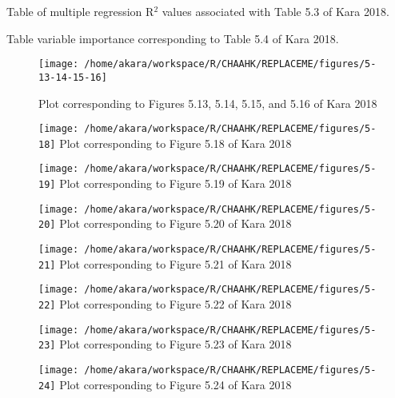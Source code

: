 \documentclass{article}
\begin{document}
\begin{table}[H]
\end{table}
\noindent Table of multiple regression R$ ^{2} $ values associated with Table 5.3 of Kara 2018.
\newline
\begin{table}[H]
\end{table}
\noindent Table variable importance corresponding to Table 5.4 of Kara 2018.
\begin{sidewaysfigure}
	\texttt{[image: /home/akara/workspace/R/CHAAHK/REPLACEME/figures/5-13-14-15-16]}
	\caption{Plot corresponding to Figures 5.13, 5.14, 5.15, and 5.16 of Kara 2018}
	\label{fig:5-13-16}
\end{sidewaysfigure}
\begin{figure}[H]
	\texttt{[image: /home/akara/workspace/R/CHAAHK/REPLACEME/figures/5-18]}
	Plot corresponding to Figure 5.18 of Kara 2018
	\label{fig:5-18}
\end{figure}
\begin{figure}[H]
	\texttt{[image: /home/akara/workspace/R/CHAAHK/REPLACEME/figures/5-19]}
	Plot corresponding to Figure 5.19 of Kara 2018
	\label{fig:5-19}
\end{figure}
\begin{figure}[H]
	\texttt{[image: /home/akara/workspace/R/CHAAHK/REPLACEME/figures/5-20]}
	Plot corresponding to Figure 5.20 of Kara 2018
	\label{fig:5-20}
\end{figure}
\begin{figure}[H]
	\texttt{[image: /home/akara/workspace/R/CHAAHK/REPLACEME/figures/5-21]}
	Plot corresponding to Figure 5.21 of Kara 2018
	\label{fig:5-21}
\end{figure}
\begin{figure}[H]
	\texttt{[image: /home/akara/workspace/R/CHAAHK/REPLACEME/figures/5-22]}
	Plot corresponding to Figure 5.22 of Kara 2018
	\label{fig:5-22}
\end{figure}
\begin{figure}[H]
	\texttt{[image: /home/akara/workspace/R/CHAAHK/REPLACEME/figures/5-23]}
	Plot corresponding to Figure 5.23 of Kara 2018
	\label{fig:5-23}
\end{figure}
\begin{figure}[H]
	\texttt{[image: /home/akara/workspace/R/CHAAHK/REPLACEME/figures/5-24]}
	Plot corresponding to Figure 5.24 of Kara 2018
	\label{fig:5-24}
\end{figure}
\end{document}
